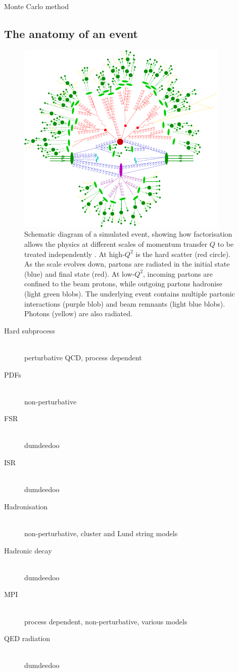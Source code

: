 
\cite{MCnet:general}

Monte Carlo method

\subsection{The anatomy of an event}

\begin{figure}
	\includegraphics[width=\largefigwidth]{tex/tools/event}
	\caption{Schematic diagram of a simulated \ttH event, showing how factorisation allows 
	the physics at different scales of momentum transfer $Q$ to be treated independently 
	\cite{MCnet:MatchingLectures}.
	At high-$Q^2$ is the hard scatter (red circle). As the scale evolves down, partons are 
	radiated in the initial state (blue) and final state (red). At low-$Q^2$, incoming 
	partons are confined to the beam protons, while outgoing partons hadronise (light 
	green blobs). The underlying event contains multiple partonic interactions (purple 
	blob) and beam remnants (light blue blobs). Photons (yellow) are also radiated.}
	\label{fig:mcevent}
\end{figure}

\begin{description}
\item[Hard subprocess] \hfill \\
	perturbative QCD, process dependent
\item[\acp{PDF}] \hfill \\
	non-perturbative
\item[\ac{FSR}] \hfill \\
	dumdeedoo
\item[\ac{ISR}] \hfill \\
	dumdeedoo
\item[Hadronisation] \hfill \\
	non-perturbative, cluster and Lund string models
\item[Hadronic decay] \hfill \\
	dumdeedoo
\item[\ac{MPI}] \hfill \\
	process dependent, non-perturbative, various models
\item[\acs{QED} radiation] \hfill \\
	dumdeedoo
\end{description}

